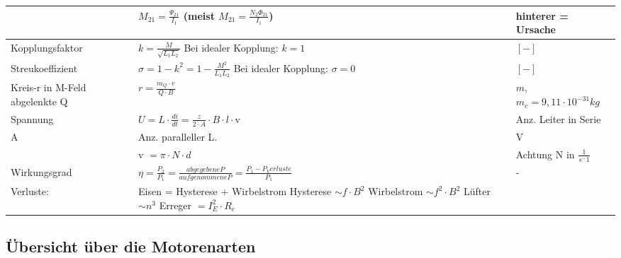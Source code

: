\begin{tabular}[c]{ | p{5cm} | p{8cm} | p{4cm} | }
            &
            $M_{21} = \frac{\Psi_{21}}{I_1}$  (meist $M_{21} = \frac{N_2 \Phi_{21}}{I_1}$) &
            hinterer = Ursache \\
            \hline
            Kopplungsfaktor &
            $k = \frac{M}{\sqrt{L_1 L_2}}$ Bei idealer Kopplung: $k = 1$ &
            $[-]$ \\
            \hline
            Streukoeffizient &
            $\sigma = 1 - k^2 = 1 -\frac{M^2}{L_1 L_2}$ Bei idealer Kopplung: $\sigma = 0$ &
            $[-]$ \\
            \hline
            Kreis-r in M-Feld abgelenkte Q &
            $r = \frac{m_Q \cdot v}{Q \cdot B}$ &
            $m$, $ m_e = 9,11 \cdot 10^{-31} kg$ \\
            \hline
            Spannung &
            \renewcommand{\arraystretch}{1}
            $U = L \cdot \frac{di}{dt}= \frac{z}{2\cdot A} \cdot B \cdot l \cdot $v \quad 
            \begin{array}[t]{ll}
                z & Anz. Leiter in Serie \\
                A & Anz. paralleller L.
            \end{array}
            \renewcommand{\arraystretch}{1.8}
            &
            V \\
            & v $= \pi \cdot N \cdot d $ & Achtung N in $\frac{1}{s^-1}$ \\ \hline
            Wirkungsgrad &
            $\eta = \frac{P_2}{P_1}=\frac{abgegebene P}{aufgenommene P}= \frac{P_1 - P_Verluste}{P_1}$ &
            - \\
            \hline
            Verluste: &
            Eisen = Hysterese + Wirbelstrom \qquad Hysterese $\sim f \cdot B^2$ \qquad Wirbelstrom $\sim f^2 \cdot B^2$ \qquad Lüfter $ \sim n^3$ \qquad\qquad Erreger $ = I_E ^2 \cdot R_e $ &
            \\
            \hline
        \end{tabular}
        \renewcommand{\arraystretch}{1.4}	
        
        \subsection{Übersicht über die Motorenarten}

